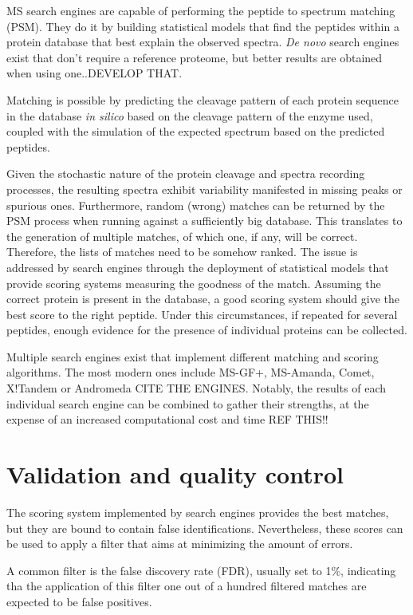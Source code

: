 \documentclass[11pt, a4paper]{report}
\begin{document}
\ac{MS} search engines are capable of performing the peptide to spectrum matching (PSM). They do it by building statistical models that find the peptides within a protein database that best explain the observed spectra. \textit{De novo} search engines exist that don't require a reference proteome, but better results are obtained when using one..DEVELOP THAT.

Matching is possible by predicting the cleavage pattern of each protein sequence in the database \textit{in silico} based on the cleavage pattern of the enzyme used, coupled with the simulation of the expected spectrum based on the predicted peptides.

Given the stochastic nature of the protein cleavage and spectra recording processes, the resulting spectra exhibit variability manifested in missing peaks or spurious ones. Furthermore, random (wrong) matches can be returned by the PSM process when running against a sufficiently big database. This translates to the generation of multiple matches, of which one, if any, will be correct. Therefore, the lists of matches need to be somehow ranked. The issue is addressed by search engines through the deployment of statistical models that provide scoring systems measuring the goodness of the match. Assuming the correct protein is present in the database, a good scoring system should give the best score to the right peptide. Under this circumstances, if repeated for several peptides, enough evidence for the presence of individual proteins can be collected.

Multiple search engines exist that implement different matching and scoring algorithms. The most modern ones include MS-GF+, MS-Amanda, Comet, X!Tandem or Andromeda CITE THE ENGINES. Notably, the results of each individual search engine can be combined to gather their strengths, at the expense of an increased computational cost and time REF THIS!!



\section{Validation and quality control}
\label{sec:validation}

The scoring system implemented by search engines provides the best matches, but they are bound to contain false identifications. Nevertheless, these scores can be used to apply a filter that aims at minimizing the amount of errors.

A common filter is the false discovery rate (FDR), usually set to 1\%, indicating tha the application of this filter one out of a hundred filtered matches are expected to be false positives.
\end{document}
